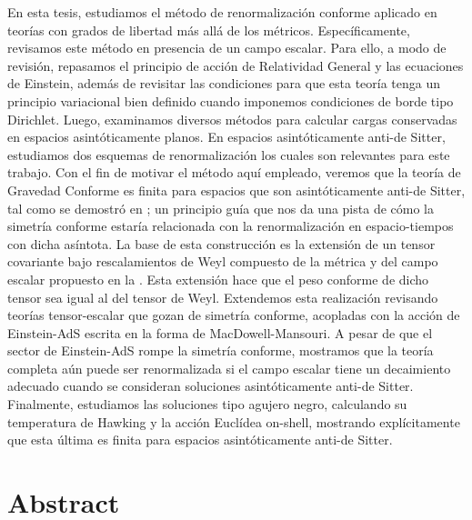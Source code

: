 \documentclass[../Main.tex]{subfiles}
\begin{document}
En esta tesis, estudiamos el método de renormalización conforme aplicado en teorías con grados de libertad más allá de los métricos. Específicamente, revisamos este método en presencia de un campo escalar. Para ello, a modo de revisión, repasamos el principio de acción de Relatividad General y las ecuaciones de Einstein, además de revisitar las condiciones para que esta teoría tenga un principio variacional bien definido cuando imponemos condiciones de borde tipo Dirichlet. Luego, examinamos diversos métodos para calcular cargas conservadas en espacios asintóticamente planos. En espacios asintóticamente anti-de Sitter, estudiamos dos esquemas de renormalización los cuales son relevantes para este trabajo. Con el fin de motivar el método aquí empleado, veremos que la teoría de Gravedad Conforme es finita para espacios que son asintóticamente anti-de Sitter, tal como se demostró en \cite{Grumiller_2014}; un principio guía que nos da una pista de cómo la simetría conforme estaría relacionada con la renormalización en espacio-tiempos con dicha asíntota. La base de esta construcción es la extensión de un tensor covariante bajo rescalamientos de Weyl compuesto de la métrica y del campo escalar propuesto en la \cite{Oliva:2011np}. Esta extensión hace que el peso conforme de dicho tensor sea igual al del tensor de Weyl. Extendemos esta realización revisando teorías tensor-escalar que gozan de simetría conforme, acopladas con la acción de Einstein-AdS escrita en la forma de MacDowell-Mansouri. A pesar de que el sector de Einstein-AdS rompe la simetría conforme, mostramos que la teoría completa aún puede ser renormalizada si el campo escalar tiene un decaimiento adecuado cuando se consideran soluciones asintóticamente anti-de Sitter. Finalmente, estudiamos las soluciones tipo agujero negro, calculando su temperatura de Hawking y la acción Euclídea on-shell, mostrando explícitamente que esta última es finita para espacios asintóticamente anti-de Sitter.


\par\vspace*{\fill} %

\newpage
{} %
\section*{Abstract}
\end{document}
